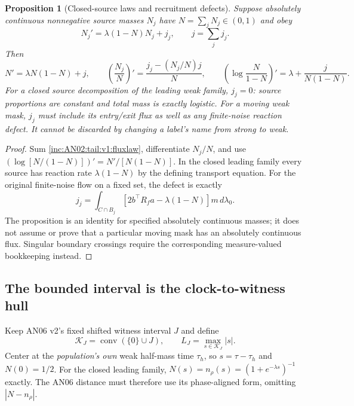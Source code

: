 \documentclass[11pt]{article}
\numberwithin{equation}{section}
\newtheorem{proposition}[theorem]{Proposition}
\theoremstyle{remark}\newtheorem{remark}[theorem]{Remark}
\newcommand{\dd}{\,d}
\newcommand{\1}{\mathbf 1}
\begin{document}
\begin{proposition}[Closed-source laws and recruitment defects]
\label{inc:AN02:tail:v1:sourceclock}
Suppose absolutely continuous nonnegative source masses $N_j$ have
$N=\sum_jN_j\in(0,1)$ and obey
\begin{equation}\label{inc:AN02:tail:v1:fluxlaw}
 N_j'=\lambda(1-N)N_j+j_j,\qquad j=\sum_jj_j.
\end{equation}
Then
\begin{equation}\label{inc:AN02:tail:v1:fluxidentities}
 N'=\lambda N(1-N)+j,\qquad
 \left(\frac{N_j}N\right)'=\frac{j_j-(N_j/N)j}{N},\qquad
 \left(\log\frac N{1-N}\right)'=\lambda+\frac{j}{N(1-N)}.
\end{equation}
For a closed source decomposition of the leading weak family, $j_j=0$:
source proportions are constant and total mass is exactly logistic.
For a moving weak mask, $j_j$ must include its entry/exit flux as well as
any finite-noise reaction defect. It cannot be discarded by changing a
label's name from strong to weak.
\end{proposition}
\begin{proof}
Sum \eqref{inc:AN02:tail:v1:fluxlaw}, differentiate $N_j/N$, and use
$(\log[N/(1-N)])'=N'/[N(1-N)]$. In the closed leading family every
source has reaction rate $\lambda(1-N)$ by the defining transport equation.
For the original finite-noise flow on a fixed set, the defect is exactly
\[
 j_j=\int_{C\cap B_j}
 [2b^\top R_fa-\lambda(1-N)]m\dd\lambda_0.
\]
The proposition is an identity for specified absolutely continuous masses;
it does not assume or prove that a particular moving mask has an
absolutely continuous flux. Singular boundary crossings require the
corresponding measure-valued bookkeeping instead.
\end{proof}

\subsection{The bounded interval is the clock-to-witness hull}
Keep AN06 v2's fixed shifted witness interval $J$ and define
\[
 \mathcal K_J=\operatorname{conv}(\{0\}\cup J),\qquad
 L_J=\max_{s\in\mathcal K_J}|s|.
\]
Center at the \emph{population's own} weak half-mass time $\tau_h$, so
$s=\tau-\tau_h$ and $N(0)=1/2$. For the closed leading family,
$N(s)=n_\rho(s)=(1+e^{-\lambda s})^{-1}$ exactly. The AN06 distance must
therefore use its phase-aligned form, omitting $|N-n_\rho|$.
\end{document}
